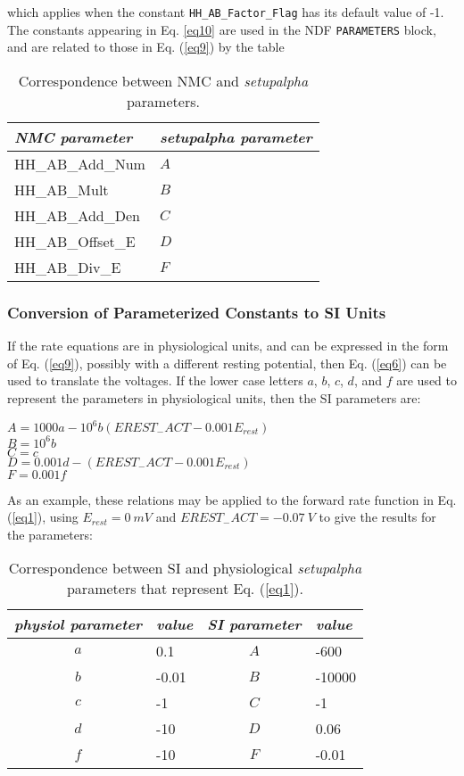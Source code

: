 \documentclass[12pt]{article}
\begin{document}
which applies when the constant {\tt HH\_AB\_Factor\_Flag} has its default
value of -1. The constants appearing in Eq. \ref{eq10} are used in the
NDF {\tt PARAMETERS} block, and are related to those in Eq. (\ref{eq9})
by the table

\begin{table}[thb]
\label{tab3}
\centering
\begin{tabular}{ll} \hline
{\em NMC parameter}	 & {\em setupalpha parameter} \\
\hline
 HH\_AB\_Add\_Num  & $A$ \\
 HH\_AB\_Mult & $B$ \\
 HH\_AB\_Add\_Den   & $C$ \\
 HH\_AB\_Offset\_E & $D$ \\
 HH\_AB\_Div\_E & $F$ \\
\hline
\end{tabular}
\caption{Correspondence between NMC and {\em setupalpha} parameters.}
\end{table}

\subsubsection{Conversion of Parameterized Constants to SI Units}
\label{sec4-1}

If the rate equations are in physiological units, and can be expressed
in the form of Eq. (\ref{eq9}), possibly with a different resting potential,
then Eq. (\ref{eq6}) can be used to translate the voltages.  If the lower case
letters $a$, $b$, $c$, $d$, and $f$ are used to represent the parameters
in physiological units, then the SI parameters are:

$A = 1000 a - 10^6 b (EREST_{-}ACT - 0.001 E_{rest})$ \\
$B = 10^6 b$ \\
$C = c$ \\
$D = 0.001 d - (EREST_{-}ACT - 0.001 E_{rest})$ \\
$F = 0.001 f$

As an example, these relations may be applied to the forward rate function
in Eq. (\ref{eq1}), using $E_{rest} = 0 ~mV$ and $EREST_{-}ACT = -0.07 ~V$
to give the results for the parameters:

\begin{table}[thb]
\label{tab4}
\centering
\begin{tabular}{clcl} \hline
{\em physiol parameter } & {\em value}  & {\em SI parameter} & {\em value} \\
\hline

$a$  & 0.1 & $A$ & -600 \\
$b$  & -0.01 & $B$ & -10000 \\
$c$  & -1 & $C$ & -1 \\
$d$  & -10 & $D$ & 0.06 \\
$f$  & -10 & $F$ & -0.01 \\
\hline
\end{tabular}
\caption{Correspondence between SI and physiological {\em setupalpha}
parameters that represent Eq. (\ref{eq1}).}
\end{table}
\end{document}

